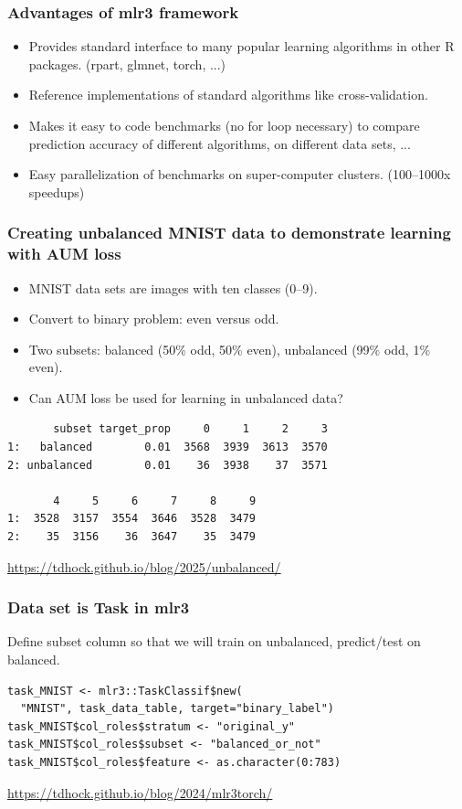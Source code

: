 \documentclass{beamer}
\begin{document}
\begin{frame}
  \frametitle{Advantages of mlr3 framework}
  \begin{itemize}
  \item Provides standard interface to many popular learning
    algorithms in other R packages. (rpart, glmnet, torch, ...)
  \item Reference implementations of standard algorithms like
    cross-validation.
  \item Makes it easy to code benchmarks  (no for loop necessary) to
    compare prediction accuracy of different algorithms, on different
    data sets, ...
  \item Easy parallelization of benchmarks on super-computer
    clusters. (100--1000x speedups)
  \end{itemize}
\end{frame}

\begin{frame}[fragile]
  \frametitle{Creating unbalanced MNIST data to demonstrate learning with AUM loss}
  \begin{itemize}
  \item MNIST data sets are images with ten classes (0--9).
  \item Convert to binary problem: even versus odd.
  \item Two subsets: balanced (50\% odd, 50\% even), unbalanced (99\%
    odd, 1\% even).
  \item Can AUM loss be used for learning in unbalanced data?
  \end{itemize}
\begin{verbatim}
       subset target_prop     0     1     2     3
1:   balanced        0.01  3568  3939  3613  3570
2: unbalanced        0.01    36  3938    37  3571

       4     5     6     7     8     9
1:  3528  3157  3554  3646  3528  3479
2:    35  3156    36  3647    35  3479
\end{verbatim}
  \url{https://tdhock.github.io/blog/2025/unbalanced/}
\end{frame}

\begin{frame}[fragile]
  \frametitle{Data set is Task in mlr3}

  Define subset column so that we will train on unbalanced,
  predict/test on balanced.
  
\begin{verbatim}
task_MNIST <- mlr3::TaskClassif$new(
  "MNIST", task_data_table, target="binary_label")
task_MNIST$col_roles$stratum <- "original_y"
task_MNIST$col_roles$subset <- "balanced_or_not"
task_MNIST$col_roles$feature <- as.character(0:783)
\end{verbatim}
  \url{https://tdhock.github.io/blog/2024/mlr3torch/}
\end{frame}
\end{document}
